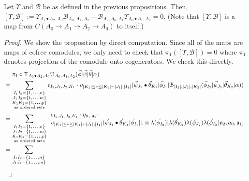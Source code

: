 \begin{prop}
\label{prop:c5}
Let $\Upsilon$ and $\mathcal{B}$ be as 
defined in the previous propositions. 
Then, $[\Upsilon, \mathcal{B}] := 
\Upsilon_{A_1\bullet A_2, A_0} 
\mathcal{B}_{A_0,A_1,A_2} - 
\mathcal{B}_{A_2, A_0, A_1} 
\Upsilon_{A_0 \bullet A_1, A_2} = 0$. 
(Note that $[\Upsilon, \mathcal{B}]$ is 
a map from $C(A_0 \to A_1 \to A_2 \to A_0)$ 
to itself.)
\end{prop}
%
\begin{proof}
We show the proposition by direct computation. 
Since all of the maps are maps of cofree 
comodules, we only need to check that 
$\pi_1([\Upsilon, \mathcal{B}]) = 0$ where 
$\pi_1$ denotes projection of the comodule 
onto cogenerators. We check this directly.
%
\begin{equation*}
\begin{aligned}
&\phantom{{}={}}
\pi_1 \circ \Upsilon_{A_1\bullet A_2, A_0} 
  \mathcal{B}_{A_0,A_1,A_2} 
  (\vec{\phi} | \vec{\psi} | \vec{\theta} | \alpha ) \\
&= 
\sum \limits_{\substack{
  I_1I_2 = \{1,\smdots,n\}\\
  J_1J_2 = \{1,\smdots,m\}\\
  K_1K_2 = \{1,\smdots,p\}\\
  \textrm{as ordered sets}}}
\epsilon_{I_2,J_1,J_2,K_1}\cdot
\upsilon_{|K_1| \leq * \leq |K_1|+|J_1|, |I_1|} (
   \vec{\psi}_{J_1} \bullet \vec{\theta}_{K_1} | 
   \vec{\phi}_{I_1} | 
   \mathcal{B}_{|I_2|, |J_2|, |K_2|} (
   \vec{\phi}_{I_2} | \vec{\psi}_{J_2} | \vec{\theta}_{K_2} | \alpha)) \\
&= 
\sum \limits_{\substack{
  I_1I_2 = \{1,\smdots,n\}\\
  J_1J_2 = \{1,\smdots,m\}\\
  K_1K_2 = \{1,\smdots,p\}\\
  \textrm{as ordered sets}}}
\begin{array}{l}  
\epsilon_{I_2,J_1,J_2,K_1}\cdot
\eta_{\mathfrak{a}_1, \mathfrak{a}_2} \cdot\\
\upsilon_{|K_1| \leq * \leq |K_1|+|J_1|, |I_1|} (
   \vec{\psi}_{J_1} \bullet \vec{\theta}_{K_1} | 
   \vec{\phi}_{I_1} |
   1 \otimes \lambda(\vec{\phi}_{I_2})[
     \lambda(\vec{\theta}_{K_2}) \lambda(\vec{\psi}_{J_2}) 
     \lambda(\vec{\phi}_{I_3}) 
     \mathfrak{a}_2, a_0, \mathfrak{a}_1] 
\end{array} \\
&= 
\sum \limits_{\substack{
  I_1I_2 = \{1,\smdots,n\}\\
  J_1J_2 = \{1,\smdots,m\}\\
}}
\end{aligned}
\end{equation*}
\end{proof}
